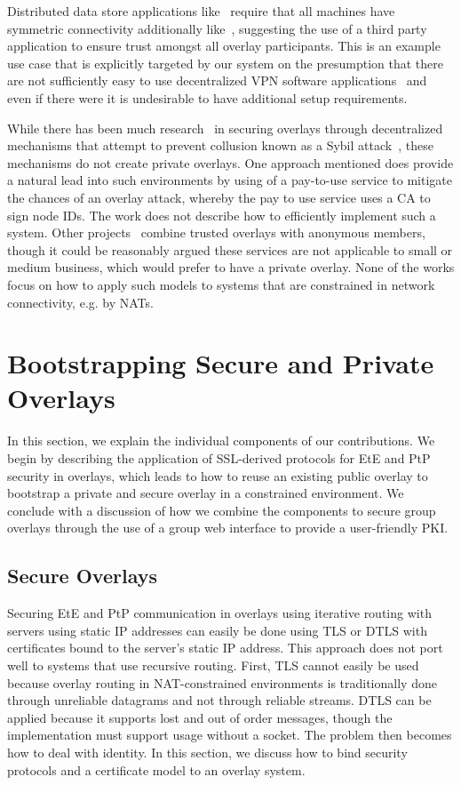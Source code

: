 \documentclass[conference]{IEEEtran}
\begin{document}
Distributed data store applications like~\cite{dynamo, bigtable} require that
all machines have symmetric connectivity additionally like~\cite{past}, suggesting
the use of a third party application to ensure trust amongst all overlay
participants.  This is an example use case that is explicitly targeted by our
system on the presumption that there are not sufficiently easy to use
decentralized VPN software applications~\cite{sc09, nsdi10} and even if there
were it is undesirable to have additional setup requirements.

While there has been much research~\cite{secure_routing} in securing overlays
through decentralized mechanisms that attempt to prevent collusion known as
a Sybil attack~\cite{sybil}, these mechanisms do not create private overlays.
One approach mentioned does provide a natural lead into such
environments by using of a pay-to-use service to mitigate the chances
of an overlay attack, whereby the pay to use service uses a CA to sign node
IDs.  The work does not describe how to efficiently implement such a system.
Other projects~\cite{stone, tor} combine trusted overlays
with anonymous members, though it could be reasonably argued these services are
not applicable to small or medium business, which would prefer to have a private
overlay.  None of the works focus on how to apply such models to
systems that are constrained in network connectivity, e.g. by NATs.

\section{Bootstrapping Secure and Private Overlays}
\label{contributions}
In this section, we explain the individual components of our contributions.  We
begin by describing the application of SSL-derived protocols for EtE and PtP security in
overlays, which leads to how to reuse an existing public overlay to bootstrap a
private and secure overlay in a constrained environment.  We conclude with a
discussion of how we combine the components to secure group overlays through
the use of a group web interface to provide a user-friendly PKI.

\subsection{Secure Overlays}
\label{secure_overlays}
Securing EtE and PtP communication in overlays using iterative routing with
servers using static IP addresses can easily be done using TLS or DTLS with
certificates bound to the server's static IP address.  This approach does not
port well to systems that use recursive routing. First, TLS cannot easily be used
because overlay routing in NAT-constrained environments is traditionally done
through unreliable datagrams and not through reliable streams.
DTLS can be applied because it supports lost and out of order messages, though
the implementation must support usage without a socket.  The
problem then becomes how to deal with identity.  In this section, we discuss how
to bind security protocols and a certificate model to an overlay system.
\end{document}
